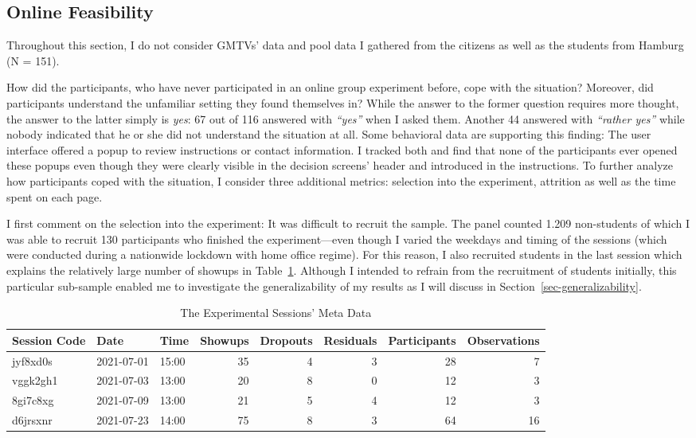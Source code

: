 \documentclass[
  authoryear,
  review,
  3p,
  onecolumn]{elsarticle}
\begin{document}
\hypertarget{sec-feasibility}{%
\subsection{Online Feasibility}\label{sec-feasibility}}

Throughout this section, I do not consider GMTVs' data and pool data I
gathered from the citizens as well as the students from Hamburg (N =
151).

How did the participants, who have never participated in an online group
experiment before, cope with the situation? Moreover, did participants
understand the unfamiliar setting they found themselves in? While the
answer to the former question requires more thought, the answer to the
latter simply is \emph{yes}: 67 out of 116 answered with \emph{``yes''}
when I asked them. Another 44 answered with \emph{``rather yes''} while
nobody indicated that he or she did not understand the situation at all.
Some behavioral data are supporting this finding: The user interface
offered a popup to review instructions or contact information. I tracked
both and find that none of the participants ever opened these popups
even though they were clearly visible in the decision screens' header
and introduced in the instructions. To further analyze how participants
coped with the situation, I consider three additional metrics: selection
into the experiment, attrition as well as the time spent on each page.

I first comment on the selection into the experiment: It was difficult
to recruit the sample. The panel counted 1.209 non-students of which I
was able to recruit 130 participants who finished the experiment---even
though I varied the weekdays and timing of the sessions (which were
conducted during a nationwide lockdown with home office regime). For
this reason, I also recruited students in the last session which
explains the relatively large number of showups in Table~\ref{tbl-meta}.
Although I intended to refrain from the recruitment of students
initially, this particular sub-sample enabled me to investigate the
generalizability of my results as I will discuss in
Section~\ref{sec-generalizability}.

\hypertarget{tbl-meta}{}
\begin{table}
\caption{\label{tbl-meta}The Experimental Sessions' Meta Data }\tabularnewline

\centering
\begin{tabular}{l|l|l|r|r|r|r|r}
\hline
Session Code & Date & Time & Showups & Dropouts & Residuals & Participants & Observations\\
\hline
jyf8xd0s & 2021-07-01 & 15:00 & 35 & 4 & 3 & 28 & 7\\
\hline
vggk2gh1 & 2021-07-03 & 13:00 & 20 & 8 & 0 & 12 & 3\\
\hline
8gi7c8xg & 2021-07-09 & 13:00 & 21 & 5 & 4 & 12 & 3\\
\hline
d6jrsxnr & 2021-07-23 & 14:00 & 75 & 8 & 3 & 64 & 16\\
\hline
\end{tabular}
\end{table}
\end{document}
